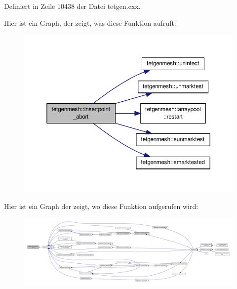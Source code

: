 Definiert in Zeile 10438 der Datei tetgen.\-cxx.



Hier ist ein Graph, der zeigt, was diese Funktion aufruft\-:\nopagebreak
\begin{figure}[H]
\begin{center}
\leavevmode
\includegraphics[width=350pt]{classtetgenmesh_ac7173aaaeb5600daa685af9c2c718834_cgraph}
\end{center}
\end{figure}




Hier ist ein Graph der zeigt, wo diese Funktion aufgerufen wird\-:\nopagebreak
\begin{figure}[H]
\begin{center}
\leavevmode
\includegraphics[width=350pt]{classtetgenmesh_ac7173aaaeb5600daa685af9c2c718834_icgraph}
\end{center}
\end{figure}


